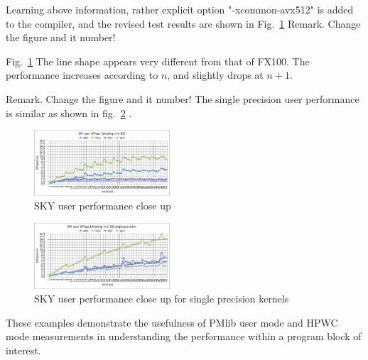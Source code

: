 \documentclass[conference]{IEEEtran}
\begin{document}
Learning above information, rather explicit option "-xcommon-avx512"
is added to the compiler, and the revised test results are shown in
Fig.~\ref{fig:sky-user-short-R8}
{\color{blue} Remark. Change the figure and it number!}


Fig.~\ref{fig:sky-user-short-R8}
The line shape appears very different from that of FX100.
The performance increases according to $ n $, and slightly drops
at $ n+1 $.

{\color{blue} Remark. Change the figure and it number!}
The single precision user performance is similar as shown in
fig.~\ref{fig:sky-user-short-R4} .


\begin{figure}[tb]
\centering
\includegraphics[width=0.45\textwidth]{figs/sky-user-short-R8.pdf}
\caption{SKY user performance close up}
\label{fig:sky-user-short-R8}
\end{figure}
\begin{figure}[tb]
\centering
\includegraphics[width=0.45\textwidth]{figs/sky-user-short-R4.pdf}
\caption{SKY user performance close up for single precision kernels}
\label{fig:sky-user-short-R4}
\end{figure}


These examples demonstrate the usefulness of PMlib user mode
and HPWC mode measurements in understanding the performance
within a program block of interest.
\end{document}
